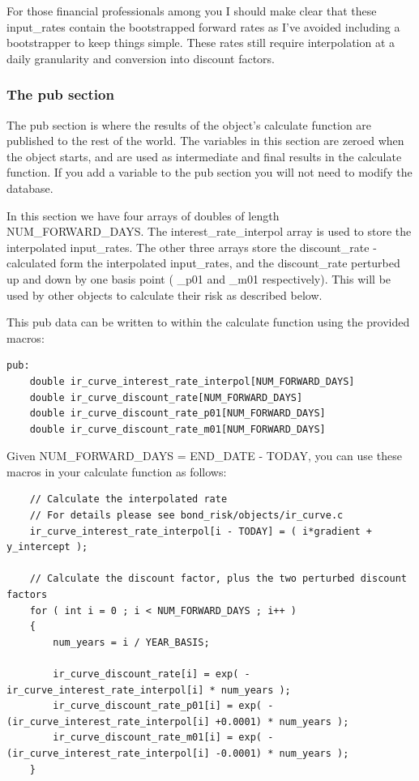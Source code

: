 \documentclass{report}
\begin{document}
For those financial professionals among you I should make clear that these input_rates contain the bootstrapped forward rates as I've avoided including a bootstrapper to keep things simple. These rates still require interpolation at a daily granularity and conversion into discount factors.

\subsubsection{The pub section}

The pub section is where the results of the object's calculate function are published to the rest of the world. The variables in this section are zeroed when the object starts, and are used as intermediate and final results in the calculate function. If you add a variable to the pub section you will not need to modify the database.  

In this section we have four arrays of doubles of length NUM_FORWARD_DAYS. The interest_rate_interpol array is used to store the interpolated input_rates. The other three arrays store the discount_rate - calculated form the interpolated input_rates, and the discount_rate perturbed up and down by one basis point ( _p01 and _m01 respectively). This will be used by other objects to calculate their risk as described below. 

This pub data can be written to within the calculate function using the provided macros:
\begin{verbatim}
pub:
    double ir_curve_interest_rate_interpol[NUM_FORWARD_DAYS]
    double ir_curve_discount_rate[NUM_FORWARD_DAYS]
    double ir_curve_discount_rate_p01[NUM_FORWARD_DAYS]
    double ir_curve_discount_rate_m01[NUM_FORWARD_DAYS]
\end{verbatim}

Given NUM_FORWARD_DAYS = END_DATE - TODAY, you can use these macros in your calculate function as follows:

\begin{verbatim}
    // Calculate the interpolated rate
    // For details please see bond_risk/objects/ir_curve.c
    ir_curve_interest_rate_interpol[i - TODAY] = ( i*gradient + y_intercept );

    // Calculate the discount factor, plus the two perturbed discount factors
    for ( int i = 0 ; i < NUM_FORWARD_DAYS ; i++ )
    {
        num_years = i / YEAR_BASIS;

        ir_curve_discount_rate[i] = exp( -ir_curve_interest_rate_interpol[i] * num_years );
        ir_curve_discount_rate_p01[i] = exp( -(ir_curve_interest_rate_interpol[i] +0.0001) * num_years );
        ir_curve_discount_rate_m01[i] = exp( -(ir_curve_interest_rate_interpol[i] -0.0001) * num_years );
    }
\end{verbatim}
\end{document}
